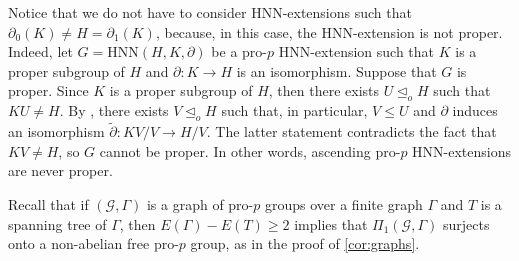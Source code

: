 \documentclass[a4paper,10pt]{amsart}
\theoremstyle{plain}
\theoremstyle{definition}
\numberwithin{equation}{section}
\begin{document}
Notice that we do not have to consider HNN-extensions such that $\partial_0(K) \neq H = \partial_1(K)$, because, in this case, the HNN-extension is not proper. Indeed, let $G=\mathrm{HNN}(H,K,\partial)$ be a pro-$p$ HNN-extension such that $K$ is a proper subgroup of $H$ and $\partial \colon K \to H$ is an isomorphism. Suppose that $G$ is proper. Since $K$ is a proper subgroup of $H$, then there exists $U \unlhd_o H$ such that $KU \neq H$. By \cite[Theorem 1.3]{Zoe94}, there exists $V \unlhd_o H$ such that, in particular, $V \leq U$ and $\partial$ induces an isomorphism $\tilde \partial \colon KV/V \to H/V$. The latter statement contradicts the fact that $KV \neq H$, so $G$ cannot be proper. In other words, ascending pro-$p$ HNN-extensions are never proper.

Recall that if $(\mathcal G, \Gamma)$ is a graph of pro-$p$ groups over a finite graph $\Gamma$ and $T$ is a spanning tree of $\Gamma$, then $E(\Gamma)-E(T) \geq 2$ implies that $\Pi_1(\mathcal G, \Gamma)$ surjects onto a non-abelian free pro-$p$ group, as in the proof of \cref{cor:graphs}.
\end{document}
